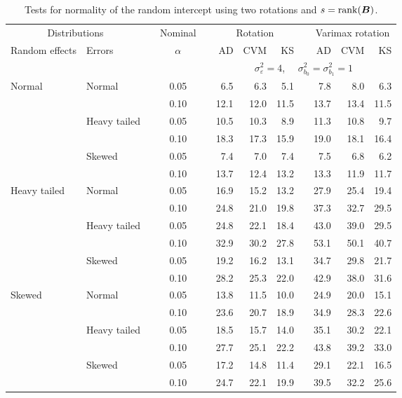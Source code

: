 \begin{table}[ht]
\caption{\label{tab:simb0sB-alt}Tests for normality of the random intercept using two rotations and $s = \operatorname{rank}(\bm{B})$.}
\begin{scriptsize}
\begin{center}
\begin{tabular}{ll p{.1cm} c p{.1cm} rrr p{.1cm} rrr}
  \hline
  \multicolumn{2}{c}{Distributions}& & Nominal & &  \multicolumn{3}{c}{Rotation} & & \multicolumn{3}{c}{Varimax rotation} \\ \cline{1-2} \cline{6-8} \cline{10-12}   
  Random effects & Errors & & $\alpha$ & & AD & CVM & KS & & AD & CVM & KS \\ 
   \hline
& && && \multicolumn{7}{c}{$\sigma_{\varepsilon}^2 = 4$, \ \ $\sigma_{b_0}^2 = \sigma_{b_1}^2 = 1$} \\ \cline{6-12}
Normal       & Normal       && 0.05 &&   6.5 & 6.3 & 5.1 &   & 7.8 & 8.0 & 6.3 \\ 
             &              && 0.10 &&   12.1 & 12.0 & 11.5 &   & 13.7 & 13.4 & 11.5 \\ 
             & Heavy tailed && 0.05 &&   10.5 & 10.3 & 8.9 &   & 11.3 & 10.8 & 9.7 \\ 
             &              && 0.10 &&   18.3 & 17.3 & 15.9 &   & 19.0 & 18.1 & 16.4 \\ 
             & Skewed       && 0.05 &&   7.4 & 7.0 & 7.4 &   & 7.5 & 6.8 & 6.2 \\ 
             &              && 0.10 &&   13.7 & 12.4 & 13.2 &   & 13.3 & 11.9 & 11.7 \\ 
Heavy tailed & Normal       && 0.05 &&   16.9 & 15.2 & 13.2 &   & 27.9 & 25.4 & 19.4 \\ 
             &              && 0.10 &&   24.8 & 21.0 & 19.8 &   & 37.3 & 32.7 & 29.5 \\ 
             & Heavy tailed && 0.05 &&   24.8 & 22.1 & 18.4 &   & 43.0 & 39.0 & 29.5 \\ 
             &              && 0.10 &&   32.9 & 30.2 & 27.8 &   & 53.1 & 50.1 & 40.7 \\ 
             & Skewed       && 0.05 &&   19.2 & 16.2 & 13.1 &   & 34.7 & 29.8 & 21.7 \\ 
             &              && 0.10 &&   28.2 & 25.3 & 22.0 &   & 42.9 & 38.0 & 31.6 \\ 
Skewed       & Normal       && 0.05 &&   13.8 & 11.5 & 10.0 &   & 24.9 & 20.0 & 15.1 \\ 
             &              && 0.10 &&   23.6 & 20.7 & 18.9 &   & 34.9 & 28.3 & 22.6 \\ 
             & Heavy tailed && 0.05 &&   18.5 & 15.7 & 14.0 &   & 35.1 & 30.2 & 22.1 \\ 
             &              && 0.10 &&   27.7 & 25.1 & 22.2 &   & 43.8 & 39.2 & 33.0 \\ 
             & Skewed       && 0.05 &&   17.2 & 14.8 & 11.4 &   & 29.1 & 22.1 & 16.5 \\ 
             &              && 0.10 &&   24.7 & 22.1 & 19.9 &   & 39.5 & 32.2 & 25.6 \\ 


\end{tabular}
\end{center}
\end{scriptsize}
\end{table}
